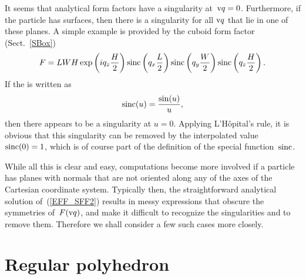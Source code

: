 %
It seems that  analytical form factors have a singularity at~$\text{v}{q}=0$.
Furthermore, if the particle has  surfaces,
then there is a singularity for all $\text{v}{q}$ that lie in one of these planes.
A simple example is provided by the cuboid form factor (Sect.~\ref{SBox})
\begin{equation}
F= L W H\exp\left(i q_z \frac{H}{2}\right) \operatorname{sinc}\left(q_x \frac{L}{2}\right)
\operatorname{sinc}\left(q_y \frac{W}{2}\right) \operatorname{sinc}\left(q_z \frac{H}{2}\right).
\end{equation}
If the  is written as
\begin{equation}
  \operatorname{sinc}(u) = \frac{\sin(u)}{u},
\end{equation}
then there appears to be a singularity at $u=0$.
Applying L'Hôpital's rule, it is obvious
that this singularity can be removed by the interpolated value
$\operatorname{sinc}(0)=1$,
which is of course part of the definition of the special function~$\operatorname{sinc}$.

While all this is clear and easy,
computations become more involved
if a particle has planes with normals that are not oriented along
any of the axes of the Cartesian coordinate system.
Typically then, the straightforward analytical solution of~(\ref{EFF_SFF2})
results in messy expressions that obscure the symmetries of~$F(\text{v}{q})$,
and make it difficult to recognize the singularities and
to remove them.
Therefore we shall consider a few such cases more closely.


\section{Regular polyhedron}

